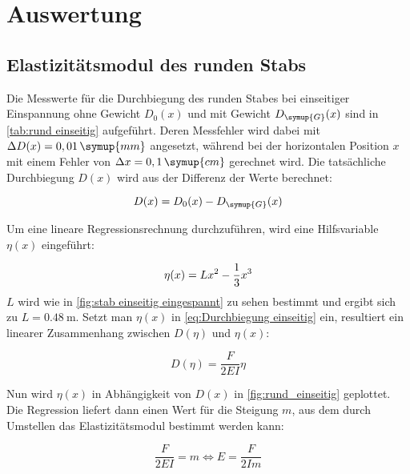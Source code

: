 \section{Auswertung}
\label{sec:Auswertung}

\subsection{Elastizitätsmodul des runden Stabs}  %
\label{sec:Elastizitätsmodul rund}

Die Messwerte für die Durchbiegung des runden Stabes bei einseitiger Einspannung ohne Gewicht $D_{0}(x)$
und mit Gewicht $D_{\symup{G}}(x)$ sind in \autoref{tab:rund einseitig} aufgeführt.
Deren Messfehler wird dabei mit $\Delta D(x) =  0,01\,\symup{mm}$ angesetzt, während bei der horizontalen Position
$x$ mit einem Fehler von $\Delta x = 0,1\,\symup{cm}$ gerechnet wird.
Die tatsächliche Durchbiegung $D(x)$ wird aus der Differenz der Werte berechnet:

\begin{equation}
  D(x)= D_{0}(x)-D_{\symup{G}}(x) \notag
  \label{eq:Delta D}
\end{equation}


Um eine lineare Regressionsrechnung durchzuführen, wird eine Hilfsvariable $\eta(x)$ eingeführt:

\begin{equation}
  \eta(x)=Lx^{2}-\frac{1}{3}x^{3} \notag
  \label{eq:eta einseitig rund}
\end{equation}
$L$ wird wie in \autoref{fig:stab einseitig eingespannt} zu sehen bestimmt und ergibt sich zu $L=\qty{0,48}{\metre}$.
Setzt man $\eta(x)$ in \autoref{eq:Durchbiegung einseitig} ein, resultiert ein linearer Zusammenhang zwischen $D(\eta)$ und $\eta(x)$:

\begin{equation}
  D(\eta)=\frac{F}{2EI}\eta
  \label{eq:Geradengleichung}
\end{equation}

Nun wird $\eta(x)$ in Abhängigkeit von $D(x)$ in \autoref{fig:rund_einseitig} geplottet.
Die Regression liefert dann einen Wert für die Steigung $m$, aus dem durch Umstellen das Elastizitätsmodul bestimmt werden kann:

\begin{equation}
  \frac{F}{2EI}=m \Leftrightarrow E=\frac{F}{2Im}
  \label{eq:Elastizitätsmodul aus Steigung}
\end{equation}

